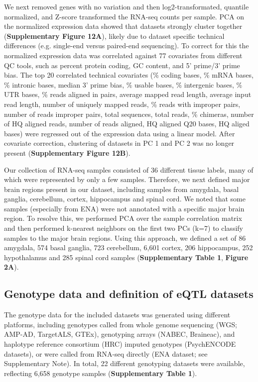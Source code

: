 We next removed genes with no variation and then log2-transformated, quantile normalized, and Z-score transformed the RNA-seq counts per sample. PCA on the normalized expression data showed that datasets strongly cluster together (\textbf{Supplementary Figure 12A}), likely due to dataset specific technical differences (e.g. single-end versus paired-end sequencing). To correct for this the normalized expression data was correlated against 77 covariates from different QC tools, such as percent protein coding, GC content, and 5’ prime/3’ prime bias. The top 20 correlated technical covariates (\% coding bases, \% mRNA bases, \% intronic bases, median 3’ prime bias, \% usable bases, \% intergenic bases, \% UTR bases, \% reads aligned in pairs, average mapped read length, average input read length, number of uniquely mapped reads, \% reads with improper pairs, number of reads improper pairs, total sequences, total reads, \% chimeras, number of HQ aligned reads, number of reads aligned, HQ aligned Q20 bases, HQ aliged bases) were regressed out of the expression data using a linear model. After covariate correction, clustering of datasets in PC 1 and PC 2 was no longer present (\textbf{Supplementary Figure 12B}).  

Our collection of RNA-seq samples consisted of 36 different tissue labels, many of which were represented by only a few samples. Therefore, we next defined major brain regions present in our dataset, including samples from amygdala, basal ganglia, cerebellum, cortex, hippocampus and spinal cord. We noted that some samples (especially from ENA) were not annotated with a specific major brain region. To resolve this, we performed PCA over the sample correlation matrix and then performed k-nearest neighbors on the first two PCs (k=7) to classify samples to the major brain regions. Using this approach, we defined a set of 86 amygdala, 574 basal ganglia, 723 cerebellum, 6,601 cortex, 206 hippocampus, 252 hypothalamus and 285 spinal cord samples (\textbf{Supplementary Table 1}, \textbf{Figure 2A}). 



\subsection{Genotype data and definition of eQTL datasets}
The genotype data for the included datasets was generated using different platforms, including genotypes called from whole genome sequencing (WGS; AMP-AD, TargetALS, GTEx\cite{consortiumGTExConsortiumAtlas2020}), genotyping arrays (NABEC, Braineac\cite{ramasamyGeneticVariabilityRegulation2014}), and haplotype reference consortium (HRC)\cite{mccarthyReferencePanel642016} imputed genotypes (PsychENCODE datasets), or were called from RNA-seq directly (ENA dataset; see Supplementary Note). In total, 22 different genotyping datasets were available, reflecting 6,658 genotype samples (\textbf{Supplementary Table 1}).  

